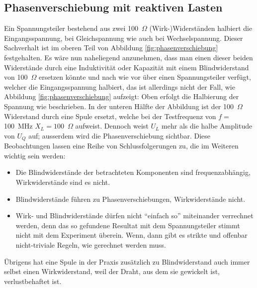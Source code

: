 \documentclass[twoside,a4paper,11pt,halfparskip,DIV=11,notitlepage]{scrartcl}
\begin{document}
\subsection{Phasenverschiebung mit reaktiven Lasten}
Ein Spannungsteiler bestehend aus zwei 100~$\Omega$ (Wirk-)Widerständen
halbiert die Eingangsspannung, bei Gleichspannung wie auch bei Wechselspannung.
Dieser Sachverhalt ist im oberen Teil von Abbildung \ref{fig:phasenverschiebung} festgehalten.
Es wäre nun naheliegend anzunehmen, dass man einen dieser beiden Widerstände
durch eine Induktivität oder Kapazität mit einem Blindwiderstand von 100~$\Omega$
ersetzen könnte und nach wie vor über einen Spannungsteiler verfügt, welcher
die Eingangsspannung halbiert, das ist allerdings nicht der Fall, wie Abbildung
\ref{fig:phasenverschiebung} aufzeigt: Oben erfolgt die Halbierung der Spannung
wie beschrieben. In der unteren Hälfte der Abbildung ist der 100~$\Omega$
Widerstand durch eine Spule ersetzt, welche bei der Testfrequenz von $f=$100~MHz
$X_L=100$~$\Omega$ aufweist. Dennoch weist $U_L$ mehr als die halbe Amplitude von
$U_Q$ auf; ausserdem wird die Phasenverschiebung sichtbar. Diese Beobachtungen
lassen eine Reihe von Schlussfolgerungen zu, die im Weiteren wichtig sein werden:

\begin{itemize}
    \item Die Blindwiderstände der betrachteten Komponenten sind frequenzabhängig,
        Wirkwiderstände sind es nicht.
    \item Blindwiderstände führen zu Phasenverschiebungen, Wirkwiderstände nicht.
    \item Wirk- und Blindwiderstände dürfen nicht ``einfach so'' miteinander
        verrechnet werden, denn das so gefundene Resultat mit dem Spannungsteiler 
        stimmt nicht mit dem Experiment überein. Wenn, dann gibt es strikte und
        offenbar nicht-triviale Regeln, wie gerechnet werden muss.
\end{itemize}

Übrigens hat eine Spule in der Praxis zusätzlich zu Blindwiderstand auch immer
selbst einen Wirkwiderstand, weil der Draht, aus dem sie gewickelt ist,
verlustbehaftet ist. 
\end{document}
